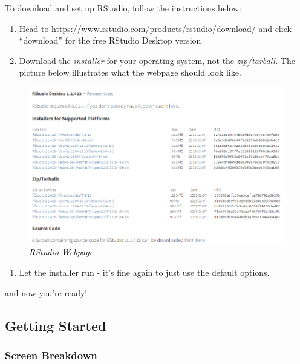 \documentclass[
]{book}
\providecommand{\tightlist}{%
  \setlength{\itemsep}{0pt}\setlength{\parskip}{0pt}}
\begin{document}
To download and set up RStudio, follow the instructions below:

\begin{enumerate}
\def\labelenumi{\arabic{enumi}.}
\item
  Head to \url{https://www.rstudio.com/products/rstudio/download/} and click ``download'' for the free RStudio Desktop version
\item
  Download the \emph{installer} for your operating system, not the \emph{zip/tarball.} The picture below illustrates what the webpage should look like.
\end{enumerate}

\begin{figure}
\centering
\includegraphics{./images/rstudio.PNG}
\caption{\emph{RStudio Webpage}}
\end{figure}

\begin{enumerate}
\def\labelenumi{\arabic{enumi}.}
\setcounter{enumi}{2}
\tightlist
\item
  Let the installer run - it's fine again to just use the default options.
\end{enumerate}

and now you're ready!

\hypertarget{getting-started}{%
\subsection{Getting Started}\label{getting-started}}

\hypertarget{screen-breakdown}{%
\subsubsection{Screen Breakdown}\label{screen-breakdown}}
\end{document}
